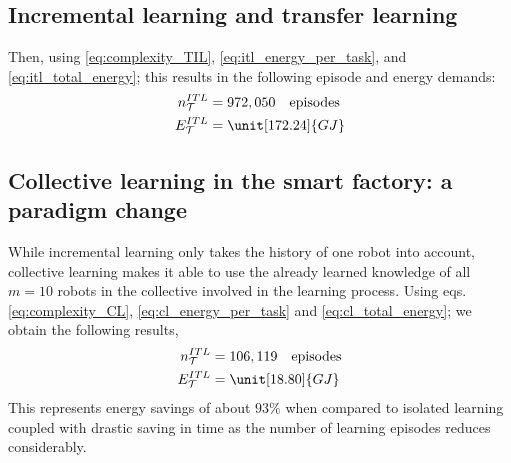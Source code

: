 \subsection{Incremental learning and transfer learning}
Then, using \eqref{eq:complexity_TIL}, \eqref{eq:itl_energy_per_task}, and \eqref{eq:itl_total_energy}; this results in the following episode and energy demands:
\begin{align}
  n^{ITL}_{\mathcal{T}} &= 972,050\quad\text{episodes} \\
  E^{ITL}_{\mathcal{T}} &= \unit[172.24]{GJ} %
\end{align}
\subsection{Collective learning in the smart factory: a paradigm change}
While incremental learning only takes the history of one robot into account, collective learning makes it able to use the already learned knowledge of all $m=10$ robots in the collective involved in the learning process. Using eqs. \eqref{eq:complexity_CL}, \eqref{eq:cl_energy_per_task} and \eqref{eq:cl_total_energy}; we obtain the following results,
\begin{align}
  n^{ITL}_{\mathcal{T}} &= 106,119\quad\text{episodes} \\
  E^{ITL}_{\mathcal{T}} &= \unit[18.80]{GJ} %
\end{align}
This represents energy savings of about $93 \%$ when compared to isolated learning coupled with drastic saving in time as the number of learning episodes reduces considerably. 
 

